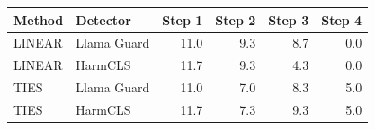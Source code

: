 \begin{tabular}{llrrrr}
\toprule
Method & Detector & Step 1 & Step 2 & Step 3 & Step 4 \\
\midrule
LINEAR & Llama Guard & 11.0 & 9.3 & 8.7 & 0.0 \\
LINEAR & HarmCLS & 11.7 & 9.3 & 4.3 & 0.0 \\
TIES & Llama Guard & 11.0 & 7.0 & 8.3 & 5.0 \\
TIES & HarmCLS & 11.7 & 7.3 & 9.3 & 5.0 \\
\bottomrule
\end{tabular}
